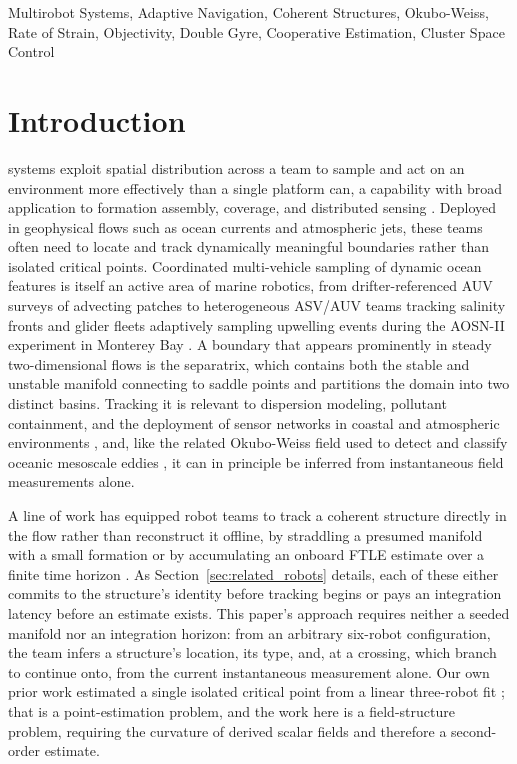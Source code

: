 \documentclass[lettersize,journal]{IEEEtran}
\begin{document}
\begin{IEEEkeywords}
Multirobot Systems, Adaptive Navigation, Coherent Structures,
Okubo-Weiss, Rate of Strain, Objectivity, Double Gyre, Cooperative
Estimation, Cluster Space Control
\end{IEEEkeywords}


\section{Introduction}
\label{sec:intro}

 systems exploit spatial distribution across a team to sample
and act on an environment more effectively than a single platform can, a
capability with broad application to formation assembly, coverage, and
distributed sensing \cite{1}. Deployed in geophysical flows such as ocean
currents and atmospheric jets, these teams often need to locate and track
dynamically meaningful boundaries rather than isolated critical points.
Coordinated multi-vehicle sampling of dynamic ocean features is itself an
active area of marine robotics, from drifter-referenced AUV surveys of
advecting patches \cite{2} to heterogeneous ASV/AUV teams tracking salinity
fronts \cite{3} and glider fleets adaptively sampling upwelling events during
the AOSN-II experiment in Monterey Bay \cite{4}. A boundary that appears
prominently in steady two-dimensional flows is the separatrix, which
contains both the stable and unstable manifold connecting to saddle
points and partitions the domain into two distinct basins. Tracking it
is relevant to dispersion modeling, pollutant containment, and the
deployment of sensor networks in coastal and atmospheric environments
\cite{6,7,8}, and, like the related Okubo-Weiss field used to detect and
classify oceanic mesoscale eddies \cite{5}, it can in principle be inferred
from instantaneous field measurements alone.

A line of work has equipped robot teams to track a coherent structure
directly in the flow rather than reconstruct it offline, by straddling a
presumed manifold with a small formation \cite{9,10,11,12} or by
accumulating an onboard FTLE estimate over a finite time horizon
\cite{13}. As Section~\ref{sec:related_robots} details, each of these
either commits to the structure's identity before tracking begins or
pays an integration latency before an estimate exists. This paper's
approach requires neither a seeded manifold nor an integration horizon:
from an arbitrary six-robot configuration, the team infers a structure's
location, its type, and, at a crossing, which branch to continue onto,
from the current instantaneous measurement alone. Our own prior work
estimated a single isolated critical point from a linear three-robot fit
\cite{14}; that is a point-estimation problem, and the work here is a
field-structure problem, requiring the curvature of derived scalar
fields and therefore a second-order estimate.
\end{document}
